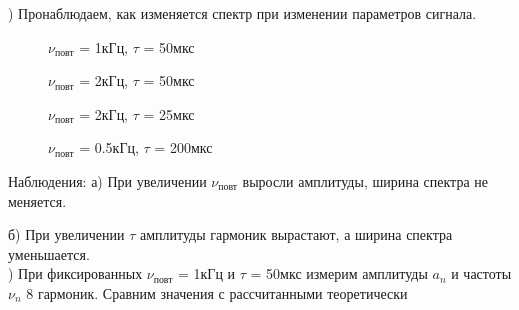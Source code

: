 \documentclass[a4paper,12pt]{article}
\begin{document}
) Пронаблюдаем, как изменяется спектр при изменении параметров сигнала. \\

\begin{figure}
\caption{$\nu_{\text{повт}}$ = 1кГц, $\tau$ = 50мкс}
\caption{$\nu_{\text{повт}}$ = 2кГц, $\tau$ = 50мкс}
\caption{$\nu_{\text{повт}}$ = 2кГц, $\tau$ = 25мкс}
\caption{$\nu_{\text{повт}}$ = 0.5кГц, $\tau$ = 200мкс}
\end{figure}

Наблюдения: а) При увеличении $\nu_{\text{повт}}$ выросли амплитуды, ширина спектра не меняется. \\
\par        б) При увеличении $\tau$ амплитуды гармоник вырастают, а ширина спектра уменьшается. \\

) При фиксированных $\nu_{\text{повт}}$ = 1кГц и $\tau$ = 50мкс измерим амплитуды $a_n$ и частоты $\nu_n$ 8 гармоник. Сравним значения с рассчитанными теоретически 
\end{document}
